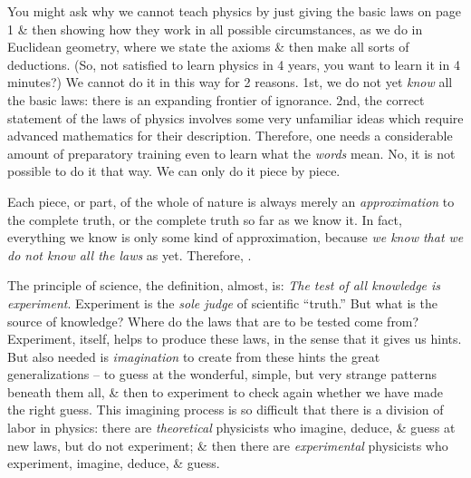 \documentclass{article}
\begin{document}
You might ask why we cannot teach physics by just giving the basic laws on page 1 \& then showing how they work in all possible circumstances, as we do in Euclidean geometry, where we state the axioms \& then make all sorts of deductions. (So, not satisfied to learn physics in 4 years, you want to learn it in 4 minutes?) We cannot do it in this way for 2 reasons. 1st, we do not yet {\it know} all the basic laws: there is an expanding frontier of ignorance. 2nd, the correct statement of the laws of physics involves some very unfamiliar ideas which require advanced mathematics for their description. Therefore, one needs a considerable amount of preparatory training even to learn what the {\it words} mean. No, it is not possible to do it that way. We can only do it piece by piece.

Each piece, or part, of the whole of nature is always merely an {\it approximation} to the complete truth, or the complete truth so far as we know it. In fact, everything we know is only some kind of approximation, because {\it we know that we do not know all the laws} as yet. Therefore, .

The principle of science, the definition, almost, is: {\it The test of all knowledge is experiment}. Experiment is the {\it sole judge} of scientific ``truth.'' But what is the source of knowledge? Where do the laws that are to be tested come from? Experiment, itself, helps to produce these laws, in the sense that it gives us hints. But also needed is {\it imagination} to create from these hints the great generalizations -- to guess at the wonderful, simple, but very strange patterns beneath them all, \& then to experiment to check again whether we have made the right guess. This imagining process is so difficult that there is a division of labor in physics: there are {\it theoretical} physicists who imagine, deduce, \& guess at new laws, but do not experiment; \& then there are {\it experimental} physicists who experiment, imagine, deduce, \& guess.
\end{document}
